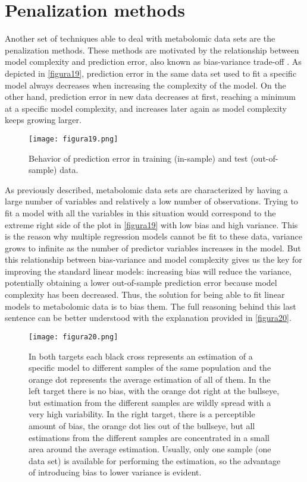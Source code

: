 \section{Penalization methods}
\label{penalmethods}
Another set of techniques able to deal with metabolomic data sets are the penalization methods. These methods are motivated by the relationship between model complexity and prediction error, also known as bias-variance trade-off \parencite{hastie2001model}. As depicted in \autoref{figura19}, prediction error in the same data set used to fit a specific model always decreases when increasing the complexity of the model. On the other hand, prediction error in new data decreases at first, reaching a minimum at a specific model complexity, and increases later again as model complexity keeps growing larger.

\begin{figure}[hbtp]
	\centering
\texttt{[image: figura19.png]}
\caption{Behavior of prediction error in training (in-sample) and test (out-of-sample) data.}
\label{figura19}
\end{figure}

As previously described, metabolomic data sets are characterized by having a large number of variables and relatively a low number of observations. Trying to fit a model with all the variables in this situation would correspond to the extreme right side of the plot in \autoref{figura19} with low bias and high variance. This is the reason why multiple regression models cannot be fit to these data, variance grows to infinite as the number of predictor variables increases in the model. But this relationship between bias-variance and model complexity gives us the key for improving the standard linear models: increasing bias will reduce the variance, potentially obtaining a lower out-of-sample prediction error because model complexity has been decreased. Thus, the solution for being able to fit linear models to metabolomic data is to bias them. The full reasoning behind this last sentence can be better understood with the explanation provided in \autoref{figura20}.

\begin{figure}[hbtp]
	\centering
\texttt{[image: figura20.png]}
\caption[No bias / high variance vs. Bias / low variance situation]{In both targets each black cross represents an estimation of a specific model to different samples of the same population and the orange dot represents the average estimation of all of them. In the left target there is no bias, with the orange dot right at the bullseye, but estimation from the different samples are wildly spread with a very high variability. In the right target, there is a perceptible amount of bias, the orange dot lies out of the bullseye, but all estimations from the different samples are concentrated in a small area around the average estimation. Usually, only one sample (one data set) is available for performing the estimation, so the advantage of introducing bias to lower variance is evident.}
\label{figura20}
\end{figure}

